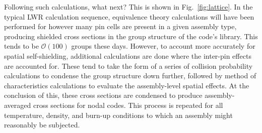 Following such calculations, what next? This is shown in Fig.~\ref{fig:lattice}. In the typical LWR calculation sequence, equivalence theory calculations will have been performed for however many pin cells are present in a given assembly type, producing shielded cross sections in the group structure of the code's library. This tends to be $\mathcal{O}(100)$ groups these days. However, to account more accurately for spatial self-shielding, additional calculations are done where the inter-pin effects are accounted for. These tend to take the form of a series of collision probability calculations to condense the group structure down further, followed by method of characteristics calculations to evaluate the assembly-level spatial effects. At the conclusion of this, these cross sections are condensed to produce assembly-averaged cross sections for nodal codes. This process is repeated for all temperature, density, and burn-up conditions to which an assembly might reasonably be subjected. 
